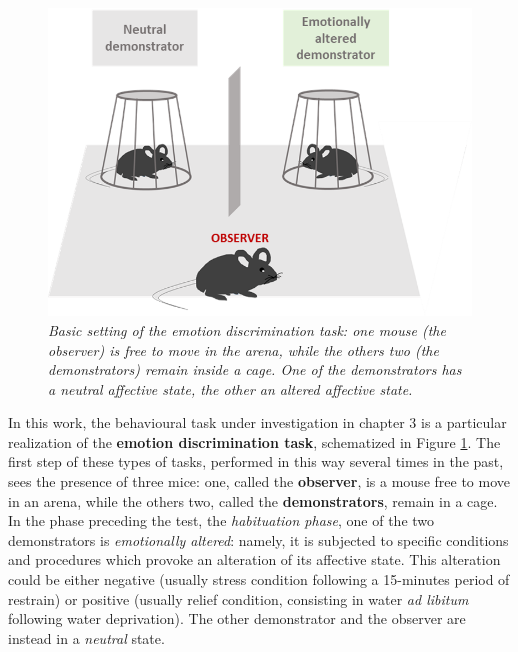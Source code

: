 \documentclass[12pt, a4paper]{report}
\begin{document}
\begin{figure}
	\begin{center}
		\includegraphics[scale=.70]{mice_task.png} 
	\end{center} 
	\caption{\textit{Basic setting of the emotion discrimination task: one mouse (the \textit{observer}) is free to move in the arena, while the others two (the \textit{demonstrators}) remain inside a cage. One of the demonstrators has a neutral affective state, the other an altered affective state.}} \label{emotion discrimination}
	
\end{figure}
In this work, the behavioural task under investigation in chapter 3 is a particular realization of the \textbf{emotion discrimination task}, schematized in Figure \ref{emotion discrimination}. The first step of these types of tasks, performed in this way several times in the past, sees the presence of three mice: one, called the \textbf{observer}, is a mouse free to move in an arena, while the others two, called the \textbf{demonstrators}, remain in a cage. In the phase preceding the test, the \textit{habituation phase}, one of the two demonstrators is \textit{emotionally altered}: namely, it is subjected to specific conditions and procedures which provoke an alteration of its affective state. This alteration could be either negative (usually stress condition following a 15-minutes period of restrain) or positive (usually relief condition, consisting in water \textit{ad libitum} following water deprivation). The other demonstrator and the observer are instead in a \textit{neutral} state.\\
\end{document}
